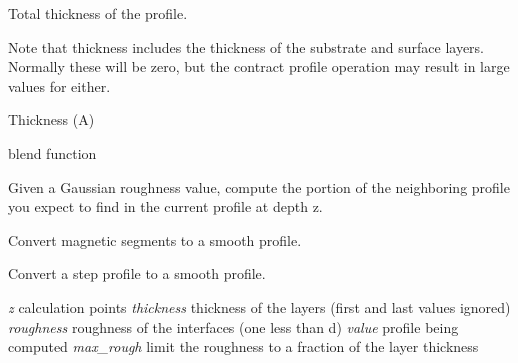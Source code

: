 \documentclass[letterpaper,10pt,english]{sphinxmanual}
\begin{document}
\begin{fulllineitems}
\begin{fulllineitems}
\end{fulllineitems}


\begin{fulllineitems}
\label{api/profile:refl1d.profile.Microslabs.thickness}
Total thickness of the profile.

Note that thickness includes the thickness of the substrate and
surface layers.  Normally these will be zero, but the contract
profile operation may result in large values for either.

\end{fulllineitems}


\begin{fulllineitems}
\label{api/profile:refl1d.profile.Microslabs.w}
Thickness (A)

\end{fulllineitems}


\end{fulllineitems}


\begin{fulllineitems}
\label{api/profile:refl1d.profile.blend}
blend function

Given a Gaussian roughness value, compute the portion of the neighboring
profile you expect to find in the current profile at depth z.

\end{fulllineitems}


\begin{fulllineitems}
\label{api/profile:refl1d.profile.build_mag_profile}
Convert magnetic segments to a smooth profile.

\end{fulllineitems}


\begin{fulllineitems}
\label{api/profile:refl1d.profile.build_profile}
Convert a step profile to a smooth profile.

\emph{z}          calculation points
\emph{thickness}  thickness of the layers (first and last values ignored)
\emph{roughness}  roughness of the interfaces (one less than d)
\emph{value}      profile being computed
\emph{max\_rough}  limit the roughness to a fraction of the layer thickness

\end{fulllineitems}
\end{document}
